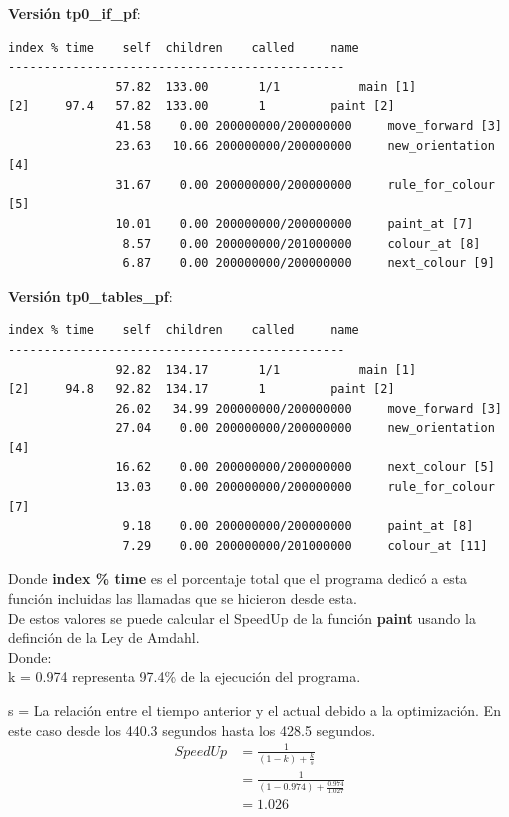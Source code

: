 \documentclass[a4paper, 10pt, twoside, notitlepage]{article}
\begin{document}
\textbf{Versión tp0\_if\_pf}:

\scriptsize
\begin{verbatim}
index % time    self  children    called     name
-----------------------------------------------
               57.82  133.00       1/1           main [1]
[2]     97.4   57.82  133.00       1         paint [2]
               41.58    0.00 200000000/200000000     move_forward [3]
               23.63   10.66 200000000/200000000     new_orientation [4]
               31.67    0.00 200000000/200000000     rule_for_colour [5]
               10.01    0.00 200000000/200000000     paint_at [7]
                8.57    0.00 200000000/201000000     colour_at [8]
                6.87    0.00 200000000/200000000     next_colour [9]
\end{verbatim}
\normalsize

\textbf{Versión tp0\_tables\_pf}:

\scriptsize
\begin{verbatim}
index % time    self  children    called     name
-----------------------------------------------
               92.82  134.17       1/1           main [1]
[2]     94.8   92.82  134.17       1         paint [2]
               26.02   34.99 200000000/200000000     move_forward [3]
               27.04    0.00 200000000/200000000     new_orientation [4]
               16.62    0.00 200000000/200000000     next_colour [5]
               13.03    0.00 200000000/200000000     rule_for_colour [7]
                9.18    0.00 200000000/200000000     paint_at [8]
                7.29    0.00 200000000/201000000     colour_at [11]
\end{verbatim}
\normalsize

Donde \textbf{index \% time} es el porcentaje total que el programa dedicó a esta función incluidas las llamadas que se hicieron desde esta.\\

De estos valores se puede calcular el SpeedUp de la función \textbf{paint} usando la definción de la Ley de Amdahl.\\

Donde:\\

k = 0.974 representa 97.4\% de la ejecución del programa.

s = La relación entre el tiempo anterior y el actual debido a la optimización. En este caso desde los 440.3 segundos hasta los 428.5 segundos.
\begin{equation*} 
\begin{split}
 SpeedUp & =\frac{1}{(1-k) + \frac{k}{s}} \\
  &=\frac{1}{(1-0.974) + \frac{0.974}{1.027}} \\
  &= 1.026
\end{split}
\end{equation*}
\end{document}
